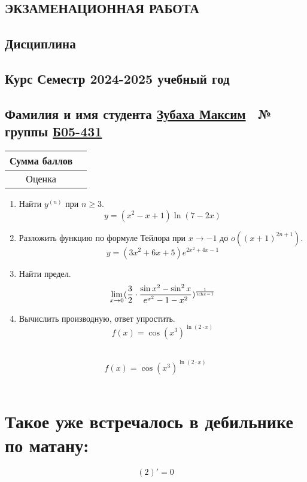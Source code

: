 \documentclass{article}
\begin{document}
\begin{Large}
\begin{onehalfspace}
\begin{center}
\section*{\huge ЭКЗАМЕНАЦИОННАЯ РАБОТА}
\subsection*{\large Дисциплина }
\subsection*{Курс  Семестр  2024-2025 учебный год}
\subsection*{Фамилия и имя студента \underline{Зубаха Максим}\ \hspace{2cm} № группы \underline{Б05-431}}
\begin{tabular}{|c|c|}
\hline 
Сумма баллов & \hspace{8cm} \\ 
\hline 
Оценка & \hspace{8cm} \\ 
\hline 
\end{tabular} 
\vspace{1cm} 
\hline 
\end{center} 
\begin{large} 
\begin{enumerate} 
\item Найти $y^{(n)}$ при $n \geq 3$. $$y = (x^2 - x + 1)\ln(7-2x)$$ 
\hline 
\item Разложить функцию по формуле Тейлора при $x \rightarrow -1$ до $o((x + 1)^{2n+1})$. $$y = (3x^2 + 6x + 5)e^{2x^2+4x-1}$$ 
\hline 
\item Найти предел. $$\lim\limits_{x \rightarrow 0}(\frac{3}{2} \cdot \frac{\sin{x^2} - \sin^2 x}{e^{x^2} - 1 - x^2})^{\frac{1}{\ch x - 1}}$$ 
\hline 
\item Вычислить производную, ответ упростить. 
$$ f(x) = \cos(x^{3})^{\ln(2 \cdot x)}$$\ \hline \
\end{enumerate}
\end{large}
$$ f(x) = \cos(x^{3})^{\ln(2 \cdot x)}$$\\
\section*{Такое уже встречалось в дебильнике по матану:}
$$(2)' = 0$$

\end{onehalfspace}
\end{Large}
\end{document}
